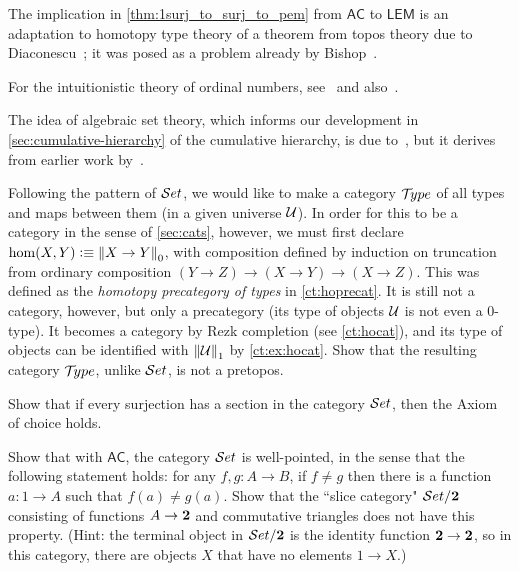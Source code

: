 The implication in \autoref{thm:1surj_to_surj_to_pem} from $\mathsf{AC}$ to $\mathsf{LEM}$ is an adaptation to homotopy type
theory of a theorem from topos theory due to Diaconescu~\cite{Diaconescu}; it was posed as a problem already by Bishop~\cite[Problem
2,p58]{Bishop1967}.

For the intuitionistic theory of ordinal numbers, see~\cite{taylor:ordinals} and also~\cite{JoyalMoerdijk1995}.

The idea of algebraic set theory, which informs our development in \autoref{sec:cumulative-hierarchy} of the cumulative hierarchy, is due to~\cite{JoyalMoerdijk1995}, but it derives from earlier work by~\cite{AczelCZF}.


\sectionExercises

\begin{ex}
Following the pattern of $\mathcal{S}et$, we would like to make a category $\mathcal{T}\!ype$ of all types and maps between them (in a given universe $\mathcal{U}$).  In order for this to be a category in the sense of \autoref{sec:cats}, however, we must first declare $\hom(X,Y) \vcentcolon\equiv \left\Vert X\to Y\right\Vert_{0}$, with composition defined by induction on truncation from ordinary composition $(Y\to Z) \to (X\to Y) \to (X\to Z)$.  This was defined as the \emph{homotopy precategory of types} in \autoref{ct:hoprecat}.  It is still not a category, however, but only a precategory (its type of objects $\mathcal{U}$ is not even a $0$-type).  It becomes a category by Rezk completion (see \autoref{ct:hocat}), and its type of objects can be identified with $\left\Vert \mathcal{U}\right\Vert_{1}$ by \autoref{ct:ex:hocat}.  Show that the resulting category $\mathcal{T}\!ype$, unlike $\mathcal{S}et$, is not a pretopos.
\end{ex}

\begin{ex}
  Show that if every surjection has a section in the category $\mathcal{S}et$, then the Axiom of choice holds.
\end{ex}

\begin{ex}
Show that with $\mathsf{AC}$, the category $\mathcal{S}et$ is well-pointed, in the sense that the following statement holds: for any $f, g : A\to B$, if $f \neq g$ then there is a function $a : 1\to A$ such that $f(a) \neq g(a)$.  Show that the ``slice category" $\mathcal{S}et/\mathbf{2}$ consisting of functions $A\to \mathbf{2}$ and commutative triangles does not have this property. (Hint: the terminal object in $\mathcal{S}et/\mathbf{2}$ is the identity function $\mathbf{2} \to \mathbf{2}$, so in this category, there are objects $X$ that have no elements $1\to X$.)
\end{ex}

